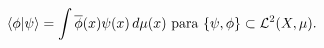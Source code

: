 \documentclass[letterpaper]{book}
\newtheorem{teorema}{Teorema}[section]
\newtheorem{def.}{Definici\'on}[section]
\newcommand{\om}{\ensuremath{\Omega}}
\newcommand{\re}{\ensuremath{\mathbb R }}
\begin{document}
\[
\braket{\phi|\psi}=\int\overline{\phi}(x)\psi(x)\,d\mu(x)\text{ para }\{\psi,\phi\}\subset\mathcal{L}^2(X,\mu).
\]
\end{document}
